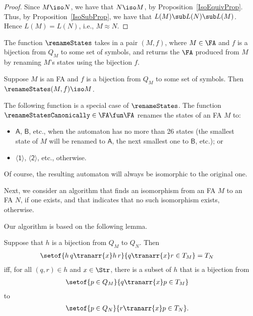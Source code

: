 \begin{proof}
Since $M\iso N$, we have that $N\iso M$, by Proposition~\ref{IsoEquivProp}.
Thus, by Proposition~\ref{IsoSubProp}, we have that $L(M)\sub L(N)\sub L(M)$.
Hence $L(M)=L(N)$, i.e., $M\approx N$.
\end{proof}

The function $\renameStates$ takes in a pair $(M,f)$, where $M\in\FA$
%
%
%
and $f$ is a bijection from $Q_M$ to some set of symbols, and returns
the $\FA$ produced from $M$ by renaming $M$'s states using the
bijection $f$.

\begin{proposition}
Suppose $M$ is an FA and $f$ is a bijection from $Q_M$ to some set of
symbols.  Then $\renameStates(M,f)\iso M$.
\end{proposition}

The following function is a special case of $\renameStates$.
The function $\renameStatesCanonically\in\FA\fun\FA$ renames the
%
%
states of an FA $M$ to:
\begin{itemize}
\item $\mathsf{A}$, $\mathsf{B}$, etc., when the automaton has no more
than 26 states (the smallest state of $M$ will be renamed to
$\mathsf{A}$, the next smallest one to $\mathsf{B}$, etc.); or

\item $\mathsf{\langle 1\rangle}$, $\mathsf{\langle 2\rangle}$, etc.,
otherwise.
\end{itemize}
Of course, the resulting automaton will always be isomorphic to the original
one.

Next, we consider an algorithm that finds an isomorphism from an FA
%
%
$M$ to an FA $N$, if one exists, and that indicates that no such
isomorphism exists, otherwise.

Our algorithm is based on the following lemma.
\begin{lemma}
\label{IsoLem}
Suppose that $h$ is a bijection from $Q_M$ to $Q_N$.  Then
\begin{gather*}
\setof{h\,q \tranarr{x} h\,r}{q \tranarr{x} r\in T_M} = T_N
\end{gather*}
iff, for all $(q, r)\in h$ and
$x\in\Str$, there is a subset of $h$ that is a bijection from
\begin{gather*}
\setof{p\in Q_M}{q \tranarr{x} p\in T_M}
\end{gather*}
to
\begin{gather*}
\setof{p\in Q_N}{r \tranarr{x} p\in T_N} .
\end{gather*}
\end{lemma}

